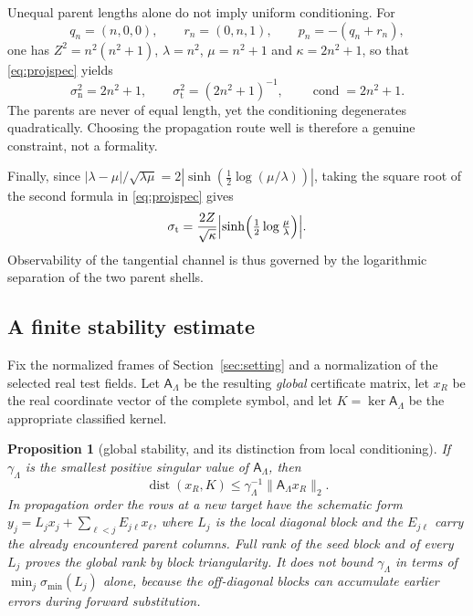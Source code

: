 \documentclass[11pt]{article}
\newtheorem{proposition}[theorem]{Proposition}
\theoremstyle{definition}
\theoremstyle{remark}
\theoremstyle{plain}
\DeclareMathOperator{\cond}{cond}
\DeclareMathOperator{\dist}{dist}
\begin{document}
Unequal parent lengths alone do not imply uniform conditioning. For
\[
q_{n}=(n,0,0),
\qquad
r_{n}=(0,n,1),
\qquad
p_{n}=-(q_{n}+r_{n}),
\]
one has $Z^{2}=n^{2}(n^{2}+1)$, $\lambda=n^{2}$, $\mu=n^{2}+1$ and
$\kappa=2n^{2}+1$, so that \eqref{eq:projspec} yields
\begin{equation}
\label{eq:badfamily}
\sigma_{\mathrm n}^{2}=2n^{2}+1,
\qquad
\sigma_{\mathrm t}^{2}=(2n^{2}+1)^{-1},
\qquad
\cond=2n^{2}+1 .
\end{equation}
The parents are never of equal length, yet the conditioning degenerates
quadratically. Choosing the propagation route well is therefore a genuine
constraint, not a formality.

Finally, since
$|\lambda-\mu|/\sqrt{\lambda\mu}
=2|\sinh(\tfrac12\log(\mu/\lambda))|$,
taking the square root of the second formula in \eqref{eq:projspec} gives
\begin{equation}
\label{eq:sinh}
\sigma_{\mathrm t}
=\frac{2Z}{\sqrt\kappa}
\Bigl|\sinh\Bigl(\tfrac12\log\tfrac\mu\lambda\Bigr)\Bigr| .
\end{equation}
Observability of the tangential channel is thus governed by the logarithmic
separation of the two parent shells.

\subsection{A finite stability estimate}
\label{subsec:stability}

Fix the normalized frames of Section~\ref{sec:setting} and a normalization of
the selected real test fields. Let $\mathsf A_{\Lambda}$ be the resulting
\emph{global} certificate matrix, let $x_{R}$ be the real coordinate vector of
the complete symbol, and let $K=\ker\mathsf A_{\Lambda}$ be the appropriate
classified kernel.

\begin{proposition}[global stability, and its distinction from local
conditioning]
\label{prop:stability}
If $\gamma_{\Lambda}$ is the smallest positive singular value of
$\mathsf A_{\Lambda}$, then
\begin{equation}
\label{eq:stability}
\dist(x_{R},K)\le\gamma_{\Lambda}^{-1}\|\mathsf A_{\Lambda}x_{R}\|_{2} .
\end{equation}
In propagation order the rows at a new target have the schematic form
$y_{j}=L_{j}x_{j}+\sum_{\ell<j}E_{j\ell}x_{\ell}$, where $L_{j}$ is the local
diagonal block and the $E_{j\ell}$ carry the already encountered parent
columns. Full rank of the seed block and of every $L_{j}$ proves the global
rank by block triangularity. It does not bound $\gamma_{\Lambda}$ in terms of
$\min_{j}\sigma_{\min}(L_{j})$ alone, because the off-diagonal blocks can
accumulate earlier errors during forward substitution.
\end{proposition}
\end{document}
